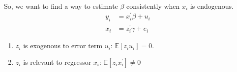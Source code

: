\begin{eg}
    \

    So, we want to find a way to estimate $\beta$ consistently when $x_i$ is endogenous.
    \begin{align*}
        y_i &= x_i^{\prime} \beta + u_i \\
        x_i &= z_i^{\prime} \gamma + e_i
    \end{align*}

    \begin{enumerate}
        \item $z_i$ is exogenous to error term $u_i$: $\mathbb{E}[z_i u_i] = 0$.
        \item $z_i$ is relevant to regressor $x_i$: $\mathbb{E}[z_i x_i^{\prime} ] \neq 0$
    \end{enumerate}


\end{eg}
